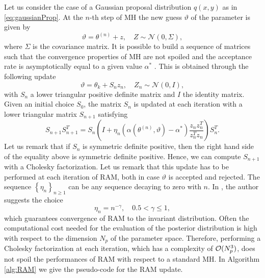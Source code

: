 Let us consider the case of a Gaussian proposal distribution $q(x,y)$ as in \eqref{eq:gaussianProp}. At the $n$-th step of MH the new guess $\vartheta$ of the parameter is given by
\begin{equation}
\vartheta = \theta^{(n)} + z, \quad Z \sim \mathcal{N}(0, \Sigma),
\end{equation}
where $\Sigma$ is the covariance matrix. It is possible to build a sequence of matrices such that the convergence properties of MH are not spoiled and the acceptance rate is asymptotically equal to a given value $\alpha^*$ \cite{Vih12}. This is obtained through the following update 
\begin{equation}
\vartheta = \theta_k + S_n z_n, \quad Z_n \sim \mathcal{N}(0, I),
\end{equation}
with $S_n$ a lower triangular positive definite matrix and $I$ the identity matrix. Given an initial choice $S_0$, the matrix $S_n$ is updated at each iteration with a lower triangular matrix $S_{n+1}$ satisfying
\begin{equation}\label{eq:RAMupdate}
S_{n+1}S_{n+1}^T = S_n\left(I + \eta_n\left(\alpha(\theta^{(n)}, \vartheta) - \alpha^*\right)\frac{z_nz_n^T}{z_n^Tz_n}\right)S_n^T.
\end{equation}
Let us remark that if $S_n$ is symmetric definite positive, then the right hand side of the equality above is symmetric definite positive. Hence, we can compute $S_{n+1}$ with a Cholesky factorization. Let us remark that this update has to be performed at each iteration of RAM, both in case $\vartheta$ is accepted and rejected. The sequence $\left\{\eta_n\right\}_{n\geq 1}$ can be any sequence decaying to zero with $n$. In \cite{Vih12}, the author suggests the choice
\begin{equation}
\eta_n = n^{-\gamma}, \quad 0.5 < \gamma \leq 1,
\end{equation}
which guarantees convergence of RAM to the invariant distribution. Often the computational cost needed for the evaluation of the posterior distribution is high with respect to the dimension $N_p$ of the parameter space. Therefore, performing a Cholesky factorization at each iteration, which has a complexity of $\mathcal{O}(N_p^3)$, does not spoil the performances of RAM with respect to a standard MH. In Algorithm \ref{alg:RAM} we give the pseudo-code for the RAM update.

